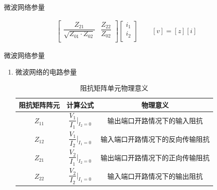 \begin{frame}{微波网络参量}
\begin{enumerate}
\begin{gather}
\begin{bmatrix*}
                      \dfrac{Z_{21}}{\sqrt{Z_{01}\cdot Z_{02}}} & \dfrac{Z_{22}}{Z_{02}}\\
                  \end{bmatrix*}
                  \begin{bmatrix*}
                      i_1 \\
                      i_2 \\
                  \end{bmatrix*}\label{eqn5-6}
                  \qquad
                  [v]=[z][i]
              \end{gather}
    \end{enumerate}
\end{frame}

\begin{frame}{微波网络参量}
    \begin{enumerate}
        \item 微波网络的电路参量
              \begin{table}
                  \caption{阻抗矩阵单元物理意义}
                  \footnotesize
                  \begin{tabular}{|c|c|c|}
                      \hline
                      \textbf{阻抗矩阵阵元} & \textbf{计算公式}                        & \textbf{物理意义}    \\ \hline
                      $Z_{11}$        & $\dfrac{V_1}{I_1}\bigg\vert_{I_2=0}$ & 输出端口开路情况下的输入阻抗   \\ \hline
                      $Z_{12}$        & $\dfrac{V_1}{I_2}\bigg\vert_{I_1=0}$ & 输入端口开路情况下的反向传输阻抗 \\ \hline
                      $Z_{21}$        & $\dfrac{V_2}{I_1}\bigg\vert_{I_2=0}$ & 输出端口开路情况下的正向传输阻抗 \\ \hline
                      $Z_{22}$        & $\dfrac{V_2}{I_2}\bigg\vert_{I_1=0}$ & 输入端口开路情况下的输出阻抗   \\ \hline
                  \end{tabular}
              \end{table}
    \end{enumerate}
\end{frame}


